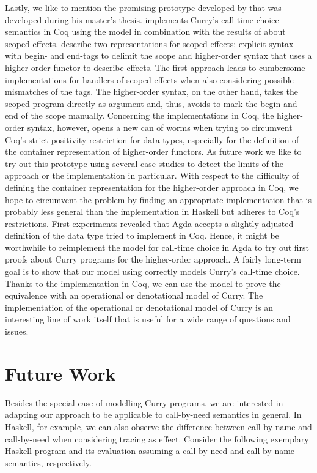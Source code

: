 Lastly, we like to mention the promising prototype developed by \citet{bunkenburg2019modeling} that was developed during his master's thesis.
\citeauthor{bunkenburg2019modeling} implements Curry's call\--time choice semantics in Coq using the  model in combination with the results of \citet{wu2014effect} about scoped effects.
\citeauthor{wu2014effect} describe two representations for scoped effects: explicit syntax with begin\-- and end\--tags to delimit the scope and higher\--order syntax that uses a higher\--order functor to describe effects.
The first approach leads to cumbersome implementations for handlers of scoped effects when also considering possible mismatches of the tags.
The higher\--order syntax, on the other hand, takes the scoped program directly as argument and, thus, avoids to mark the begin and end of the scope manually.
Concerning the implementations in Coq, the higher\--order syntax, however, opens a new can of worms when trying to circumvent Coq's strict positivity restriction for data types, especially for the definition of the container representation of higher\--order functors.
As future work we like to try out this prototype using several case studies to detect the limits of the approach or the implementation in particular.
With respect to the difficulty of defining the container representation for the higher\--order approach in Coq, we hope to circumvent the problem by finding an appropriate implementation that is probably less general than the implementation in Haskell but
adheres to Coq's restrictions.
First experiments revealed that Agda accepts a slightly adjusted definition of the data type \citeauthor{bunkenburg2019modeling} tried to implement in Coq.
Hence, it might be worthwhile to reimplement the model for call\--time choice in Agda to try out first proofs about Curry programs for the higher\--order approach.
A fairly long\--term goal is to show that our model using  correctly models Curry's call\--time choice.
Thanks to the implementation in Coq, we can use the model to prove the equivalence with an operational or denotational model of Curry.
The implementation of the operational or denotational model of Curry is an interesting line of work itself that is useful for a wide range of questions and issues.

\section{Future Work}

Besides the special case of modelling Curry programs, we are interested in adapting our approach to be applicable to call\--by\--need semantics in general.
In Haskell, for example, we can also observe the difference between call\--by\--name and call\--by\--need when considering tracing as effect.
Consider the following exemplary Haskell program and its evaluation assuming a call\--by\--need and call\--by\--name semantics, respectively.

